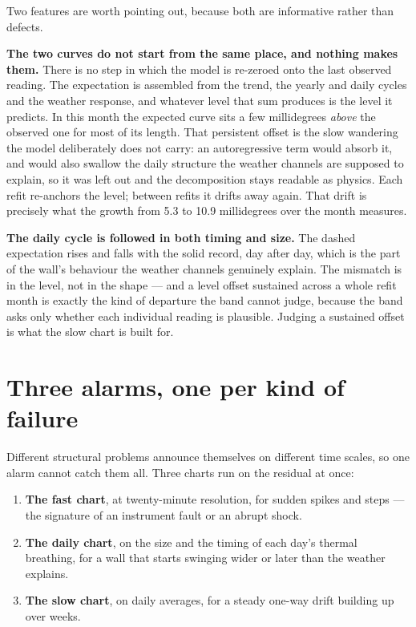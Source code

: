 \documentclass[11pt,a4paper]{article}
\begin{document}
Two features are worth pointing out, because both are informative rather than
defects.

\textbf{The two curves do not start from the same place, and nothing makes them.}
There is no step in which the model is re-zeroed onto the last observed reading.
The expectation is assembled from the trend, the yearly and daily cycles and the
weather response, and whatever level that sum produces is the level it predicts.
In this month the expected curve sits a few millidegrees \emph{above} the
observed one for most of its length. That persistent offset is the slow
wandering the model deliberately does not carry: an autoregressive term would
absorb it, and would also swallow the daily structure the weather channels are
supposed to explain, so it was left out and the decomposition stays readable as
physics. Each refit re-anchors the level; between refits it drifts away again.
That drift is precisely what the growth from 5.3 to 10.9 millidegrees over the
month measures.

\textbf{The daily cycle is followed in both timing and size.} The dashed
expectation rises and falls with the solid record, day after day, which is the
part of the wall's behaviour the weather channels genuinely explain. The mismatch
is in the level, not in the shape --- and a level offset sustained across a whole
refit month is exactly the kind of departure the band cannot judge, because the
band asks only whether each individual reading is plausible. Judging a sustained
offset is what the slow chart is built for.

\section{Three alarms, one per kind of failure}

Different structural problems announce themselves on different time scales, so
one alarm cannot catch them all. Three charts run on the residual at once:

\begin{enumerate}
    \item \textbf{The fast chart}, at twenty-minute resolution, for sudden spikes
    and steps --- the signature of an instrument fault or an abrupt shock.
    \item \textbf{The daily chart}, on the size and the timing of each day's
    thermal breathing, for a wall that starts swinging wider or later than the
    weather explains.
    \item \textbf{The slow chart}, on daily averages, for a steady one-way drift
    building up over weeks.
\end{enumerate}
\end{document}
